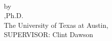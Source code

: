 \newpage
\thispagestyle{plain} 
\makeatletter
\begin{center}
\textbf{\large
\@title
}\\
\vspace{1cm}
by\\
\vspace{1cm}
\@author,\space Ph.D. \\
The University of Texas at Austin, \theyear \\
SUPERVISOR: Clint Dawson
\end{center}
\vspace{1cm}

\indent
